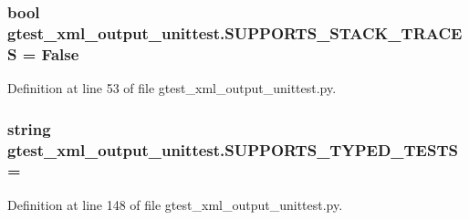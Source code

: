 \subsubsection[{\texorpdfstring{S\+U\+P\+P\+O\+R\+T\+S\+\_\+\+S\+T\+A\+C\+K\+\_\+\+T\+R\+A\+C\+ES}{SUPPORTS_STACK_TRACES}}]{\setlength{\rightskip}{0pt plus 5cm}bool gtest\+\_\+xml\+\_\+output\+\_\+unittest.\+S\+U\+P\+P\+O\+R\+T\+S\+\_\+\+S\+T\+A\+C\+K\+\_\+\+T\+R\+A\+C\+ES = False}\hypertarget{namespacegtest__xml__output__unittest_af342633908d453cee6e700fe6b73ef82}{}\label{namespacegtest__xml__output__unittest_af342633908d453cee6e700fe6b73ef82}


Definition at line 53 of file gtest\+\_\+xml\+\_\+output\+\_\+unittest.\+py.

\subsubsection[{\texorpdfstring{S\+U\+P\+P\+O\+R\+T\+S\+\_\+\+T\+Y\+P\+E\+D\+\_\+\+T\+E\+S\+TS}{SUPPORTS_TYPED_TESTS}}]{\setlength{\rightskip}{0pt plus 5cm}string gtest\+\_\+xml\+\_\+output\+\_\+unittest.\+S\+U\+P\+P\+O\+R\+T\+S\+\_\+\+T\+Y\+P\+E\+D\+\_\+\+T\+E\+S\+TS = \textquotesingle{}}\hypertarget{namespacegtest__xml__output__unittest_a07eecd027d660022c0ab447f3c3e0f2e}{}\label{namespacegtest__xml__output__unittest_a07eecd027d660022c0ab447f3c3e0f2e}


Definition at line 148 of file gtest\+\_\+xml\+\_\+output\+\_\+unittest.\+py.

